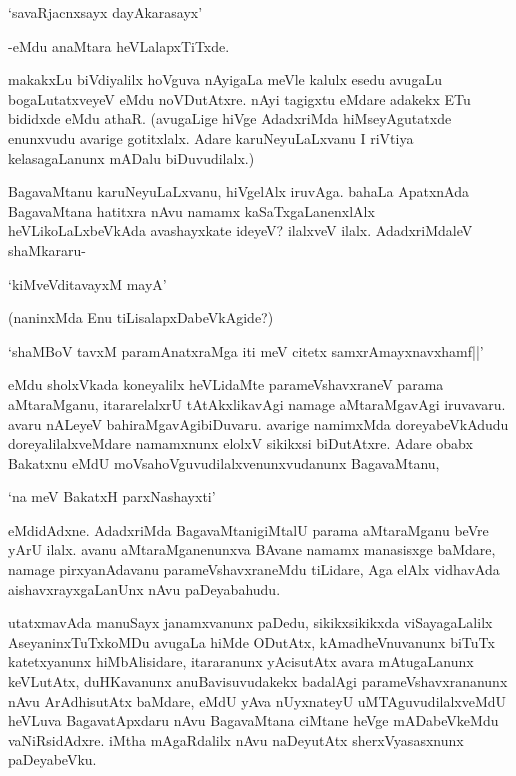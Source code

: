 \begin{shloka}
`savaRjacnxsayx dayAkarasayx'
\end{shloka}

-eMdu anaMtara heVLalapxTiTxde.

makakxLu biVdiyalilx hoVguva nAyigaLa meVle kalulx esedu avugaLu bogaLutatxveyeV eMdu noVDutAtxre. nAyi tagigxtu eMdare adakekx ETu bididxde eMdu athaR. (avugaLige hiVge AdadxriMda hiMseyAgutatxde enunxvudu avarige gotitxlalx. Adare karuNeyuLaLxvanu I riVtiya kelasagaLanunx mADalu biDuvudilalx.) 

BagavaMtanu karuNeyuLaLxvanu, hiVgelAlx iruvAga. bahaLa ApatxnAda BagavaMtana hatitxra nAvu namamx kaSaTxgaLanenxlAlx heVLikoLaLxbeVkAda avashayxkate ideyeV? ilalxveV ilalx. AdadxriMdaleV shaMkararu-

\begin{shloka}
`kiMveVditavayxM mayA'
\end{shloka}
(naninxMda Enu tiLisalapxDabeVkAgide?)

\begin{shloka}
`shaMBoV tavxM paramAnatxraMga iti meV citetx samxrAmayxnavxhamf||'
\end{shloka}

eMdu sholxVkada koneyalilx heVLidaMte parameVshavxraneV parama aMtaraMganu, itararelalxrU tAtAkxlikavAgi namage aMtaraMgavAgi iruvavaru. avaru nALeyeV bahiraMgavAgibiDuvaru. avarige namimxMda doreyabeVkAdudu doreyalilalxveMdare namamxnunx elolxV sikikxsi biDutAtxre. Adare obabx Bakatxnu eMdU moVsahoVguvudilalxvenunxvudanunx BagavaMtanu,

\begin{shloka}
`na meV BakatxH parxNashayxti'
\end{shloka}

eMdidAdxne. AdadxriMda BagavaMtanigiMtalU parama aMtaraMganu beVre yArU ilalx. avanu aMtaraMganenunxva BAvane namamx manasisxge baMdare, namage pirxyanAdavanu parameVshavxraneMdu tiLidare, Aga elAlx vidhavAda aishavxrayxgaLanUnx nAvu paDeyabahudu.

utatxmavAda manuSayx janamxvanunx paDedu, sikikxsikikxda viSayagaLalilx AseyaninxTuTxkoMDu avugaLa hiMde ODutAtx, kAmadheVnuvanunx biTuTx katetxyanunx hiMbAlisidare, itararanunx yAcisutAtx avara mAtugaLanunx keVLutAtx, duHKavanunx anuBavisuvudakekx badalAgi parameVshavxrananunx nAvu ArAdhisutAtx baMdare, eMdU yAva nUyxnateyU uMTAguvudilalxveMdU heVLuva BagavatApxdaru nAvu BagavaMtana ciMtane heVge mADabeVkeMdu vaNiRsidAdxre. iMtha mAgaRdalilx nAvu naDeyutAtx sherxVyasasxnunx paDeyabeVku.


\endchapter
